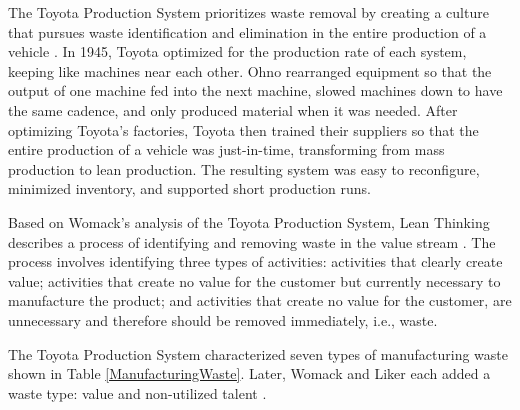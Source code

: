 The Toyota Production System prioritizes waste removal by creating a culture that pursues waste identification and elimination in the entire production of a vehicle \cite{OhnoToyotaProductionSystem, ShingoToyotaProductionSystem}. In 1945, Toyota optimized for the production rate of each system, keeping like machines near each other. Ohno rearranged equipment so that the output of one machine fed into the next machine, slowed machines down to have the same cadence, and only produced material when it was needed. After optimizing Toyota's factories, Toyota then trained their suppliers so that the entire production of a vehicle was just-in-time, transforming from mass production to lean production. The resulting  system was easy to reconfigure, minimized inventory, and supported short production runs.  

Based on Womack's analysis of the Toyota Production System, Lean Thinking describes a process of identifying and removing waste in the value stream \cite{WomackLeanThinking}. The process involves identifying three types of activities: activities that clearly create value; activities that create no value for the customer but currently necessary to manufacture the product; and activities that create no value for the customer, are unnecessary and therefore should be removed immediately, i.e., waste.

The Toyota Production System characterized seven types of manufacturing waste \cite{ShingoToyotaProductionSystem} shown in Table \ref{ManufacturingWaste}. Later, Womack and Liker each added a waste type: value and non-utilized talent \cite{WomackLeanThinking, LikerToyotaWay}.

